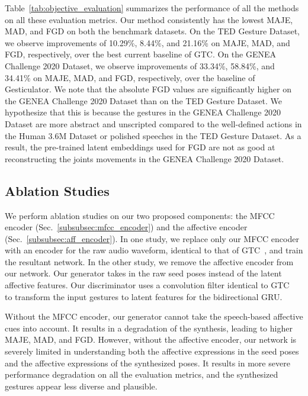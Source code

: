 \documentclass[conference,compsoc]{IEEEtran}
\theoremstyle{definition}
\begin{document}
Table~\ref{tab:objective_evaluation} summarizes the performance of all the methods on all these evaluation metrics. Our method consistently has the lowest MAJE, MAD, and FGD on both the benchmark datasets. On the TED Gesture Dataset, we observe improvements of 10.29\%, 8.44\%, and 21.16\% on MAJE, MAD, and FGD, respectively, over the best current baseline of GTC. On the GENEA Challenge 2020 Dataset, we observe improvements of 33.34\%, 58.84\%, and 34.41\% on MAJE, MAD, and FGD, respectively, over the baseline of Gesticulator. We note that the absolute FGD values are significantly higher on the GENEA Challenge 2020 Dataset than on the TED Gesture Dataset. We hypothesize that this is because the gestures in the GENEA Challenge 2020 Dataset are more abstract and unscripted compared to the well-defined actions in the Human 3.6M Dataset or polished speeches in the TED Gesture Dataset. As a result, the pre-trained latent embeddings used for FGD are not as good at reconstructing the joints movements in the GENEA Challenge 2020 Dataset.

\subsection{Ablation Studies}\label{subsec:ablation}
We perform ablation studies on our two proposed components: the MFCC encoder (Sec.~\ref{subsubsec:mfcc_encoder}) and the affective encoder (Sec.~\ref{subsubsec:aff_encoder}). In one study, we replace only our MFCC encoder with an encoder for the raw audio waveform, identical to that of GTC~\cite{trimodal}, and train the resultant network. In the other study, we remove the affective encoder from our network. Our generator takes in the raw seed poses instead of the latent affective features. Our discriminator uses a convolution filter identical to GTC~\cite{trimodal} to transform the input gestures to latent features for the bidirectional GRU.

Without the MFCC encoder, our generator cannot take the speech-based affective cues into account. It results in a degradation of the synthesis, leading to higher MAJE, MAD, and FGD. However, without the affective encoder, our network is severely limited in understanding both the affective expressions in the seed poses and the affective expressions of the synthesized poses. It results in more severe performance degradation on all the evaluation metrics, and the synthesized gestures appear less diverse and plausible.
\end{document}
